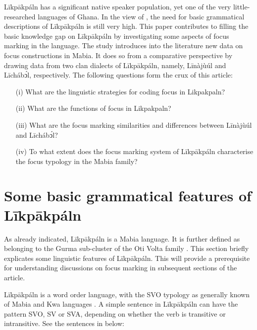 \documentclass[output=paper,colorlinks,citecolor=brown]{langscibook}
\begin{document}
Līkpākpáln has a significant native speaker population, yet one of the very little-researched languages of Ghana. In the view of \citep{Schwarz2009}, the need for basic grammatical descriptions of Līkpākpáln is still very high. This paper contributes to filling the basic knowledge gap on Līkpākpáln by investigating some aspects of focus marking in the language. The study introduces into the literature new data on focus constructions in Mabia. It does so from a comparative perspective by drawing data from two clan dialects of Līkpākpáln, namely, Līnàjùúl and Līchábͻ́l, respectively. The following questions form the crux of this article:

\begin{itemize}
    \item[(i)]      What are the linguistic strategies for coding focus in Likpakpaln?
    \item[(ii)]     What are the functions of focus in Likpakpaln?
    \item[(iii)]    What are the focus marking similarities and differences between Līnàjùúl and Līchábͻ́l?
    \item[(iv)]     To what extent does the focus marking system of Līkpākpáln characterise the focus typology in the Mabia family?
\end{itemize}

\section{Some basic grammatical features of Līkpākpáln}\label{sec:bisilki:2}

As already indicated, Līkpākpáln is a Mabia language. It is further defined as belonging to the Gurma sub-cluster of the Oti Volta family \citep{Naden1988, SteeleWeed1966}. This section briefly explicates some linguistic features of Līkpākpáln. This will provide a prerequisite for understanding discussions on focus marking in subsequent sections of the article.

Līkpākpáln is a word order language, with the SVO typology as generally known of Mabia and Kwa languages \citep{Schwarz2009}. A simple sentence in Līkpākpáln can have the pattern SVO, SV or SVA, depending on whether the verb is transitive or intransitive. See the sentences in  below:

\end{document}
